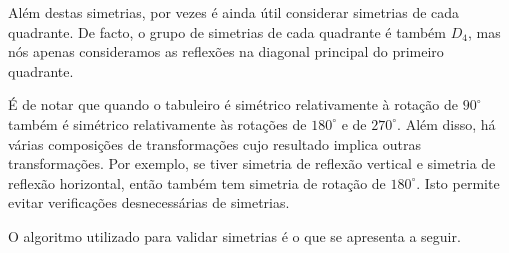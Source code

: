 Além destas simetrias, por vezes é ainda útil considerar simetrias de cada quadrante. De facto, o grupo de simetrias de cada quadrante é também $D_4$, mas nós apenas consideramos as reflexões na diagonal principal do primeiro quadrante. 

É de notar que quando o tabuleiro é simétrico relativamente à rotação de $90^{\circ}$ também é simétrico relativamente às rotações de $180^{\circ}$ e de $270^{\circ}$. Além disso, há várias composições de transformações cujo resultado implica outras transformações. Por exemplo, se tiver simetria de reflexão vertical e simetria de reflexão horizontal, então também tem simetria de rotação de $180^{\circ}$. Isto permite evitar verificações desnecessárias de simetrias. 

O algoritmo utilizado para validar simetrias é o que se apresenta a seguir.
